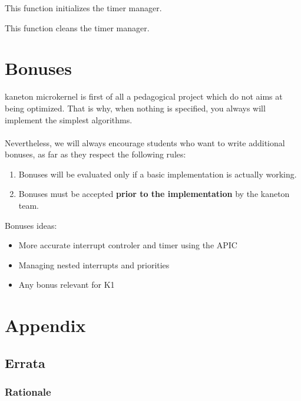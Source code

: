 	 {
	   This function initializes the timer manager.
	 }

	 {
	   This function cleans the timer manager.
	 }

%
%

\newpage

\section{Bonuses}

kaneton microkernel is first of all a pedagogical project which do not
aims at being optimized. That is why, when nothing is specified, you
always will implement the simplest algorithms.\\
\\
Nevertheless, we will always encourage students who want to write
additional bonuses, as far as they respect the following rules:

\begin{enumerate}
\item Bonuses will be evaluated only if a basic implementation is
  actually working.
\item Bonuses must be accepted \textbf{prior to the implementation}
  by the kaneton team.
\end{enumerate}

Bonuses ideas:
\begin{itemize}
\item More accurate interrupt controler and timer using the APIC
\item Managing nested interrupts and priorities
\item Any bonus relevant for K1
\end{itemize}

%
%

\newpage

\section{Appendix}

\subsection{Errata}

\subsubsection*{Rationale}

